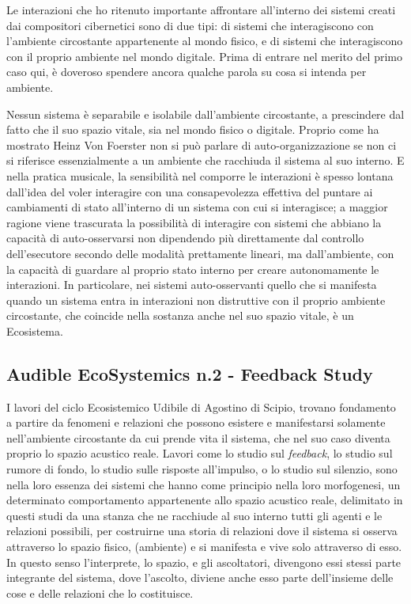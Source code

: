 Le interazioni che ho ritenuto importante affrontare 
all'interno dei sistemi creati dai compositori cibernetici sono di due tipi:
di sistemi che interagiscono con l’ambiente circostante appartenente al mondo fisico, 
e di sistemi che interagiscono con il proprio ambiente nel mondo digitale.
Prima di entrare nel merito del primo caso qui,
è doveroso spendere ancora qualche parola su cosa
si intenda per ambiente.

Nessun sistema è separabile e isolabile dall'ambiente circostante, 
a prescindere dal fatto che il suo spazio vitale, sia nel mondo fisico o digitale. 
Proprio come ha mostrato Heinz Von Foerster non si può parlare di auto-organizzazione
se non ci si riferisce essenzialmente a un ambiente che racchiuda il sistema al suo interno.
E nella pratica musicale, la sensibilità nel comporre le interazioni
è spesso lontana dall'idea del voler interagire con una consapevolezza effettiva del 
puntare ai cambiamenti di stato all'interno di un sistema con cui si interagisce;
a maggior ragione viene trascurata la possibilità di interagire con sistemi che abbiano
la capacità di auto-osservarsi non dipendendo più direttamente dal controllo dell'esecutore 
secondo delle modalità prettamente lineari, 
ma dall'ambiente, 
con la capacità di guardare al proprio stato interno per creare autonomamente le interazioni.
In particolare, nei sistemi auto-osservanti quello che si manifesta quando un sistema entra in interazioni non distruttive
con il proprio ambiente circostante, che coincide nella sostanza anche nel suo spazio vitale, è un Ecosistema.

\subsection{Audible EcoSystemics n.2 - Feedback Study}
\label{sec:Audible EcoSystemics n.2 - Feedback Study}

I lavori del ciclo Ecosistemico Udibile di Agostino di Scipio, 
trovano fondamento a partire da fenomeni e relazioni che possono esistere e manifestarsi solamente nell'ambiente 
circostante da cui prende vita il sistema, 
che nel suo caso diventa proprio lo spazio acustico reale. 
Lavori come lo studio sul \emph{feedback}, lo studio sul rumore di fondo, lo studio sulle risposte all'impulso, o
lo studio sul silenzio, sono nella loro essenza dei sistemi che hanno come principio 
nella loro morfogenesi, un determinato 
comportamento appartenente allo spazio acustico reale, delimitato in questi studi da una stanza
che ne racchiude al suo interno tutti gli agenti e le relazioni possibili,
per costruirne una storia di relazioni dove il sistema si osserva attraverso lo spazio fisico, 
(ambiente) e si manifesta e vive solo attraverso di esso.
In questo senso l’interprete, lo spazio, e gli ascoltatori, 
divengono essi stessi parte integrante del sistema, dove l’ascolto, diviene anche esso
parte dell’insieme delle cose e delle relazioni che lo costituisce. 

